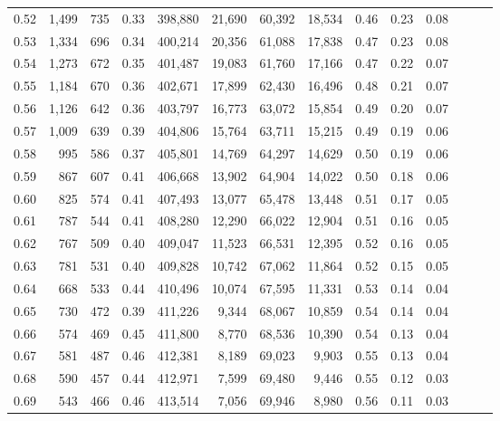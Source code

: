 \begin{tabular}{rrrrrrrrrrrrrr}
0.52 &   1,499 &    735 &  0.33 &  398,880 &   21,690 &  60,392 &  18,534 &  0.46 &  0.23 &      0.08 \\
0.53 &   1,334 &    696 &  0.34 &  400,214 &   20,356 &  61,088 &  17,838 &  0.47 &  0.23 &      0.08 \\
0.54 &   1,273 &    672 &  0.35 &  401,487 &   19,083 &  61,760 &  17,166 &  0.47 &  0.22 &      0.07 \\
0.55 &   1,184 &    670 &  0.36 &  402,671 &   17,899 &  62,430 &  16,496 &  0.48 &  0.21 &      0.07 \\
0.56 &   1,126 &    642 &  0.36 &  403,797 &   16,773 &  63,072 &  15,854 &  0.49 &  0.20 &      0.07 \\
0.57 &   1,009 &    639 &  0.39 &  404,806 &   15,764 &  63,711 &  15,215 &  0.49 &  0.19 &      0.06 \\
0.58 &     995 &    586 &  0.37 &  405,801 &   14,769 &  64,297 &  14,629 &  0.50 &  0.19 &      0.06 \\
0.59 &     867 &    607 &  0.41 &  406,668 &   13,902 &  64,904 &  14,022 &  0.50 &  0.18 &      0.06 \\
0.60 &     825 &    574 &  0.41 &  407,493 &   13,077 &  65,478 &  13,448 &  0.51 &  0.17 &      0.05 \\
0.61 &     787 &    544 &  0.41 &  408,280 &   12,290 &  66,022 &  12,904 &  0.51 &  0.16 &      0.05 \\
0.62 &     767 &    509 &  0.40 &  409,047 &   11,523 &  66,531 &  12,395 &  0.52 &  0.16 &      0.05 \\
0.63 &     781 &    531 &  0.40 &  409,828 &   10,742 &  67,062 &  11,864 &  0.52 &  0.15 &      0.05 \\
0.64 &     668 &    533 &  0.44 &  410,496 &   10,074 &  67,595 &  11,331 &  0.53 &  0.14 &      0.04 \\
0.65 &     730 &    472 &  0.39 &  411,226 &    9,344 &  68,067 &  10,859 &  0.54 &  0.14 &      0.04 \\
0.66 &     574 &    469 &  0.45 &  411,800 &    8,770 &  68,536 &  10,390 &  0.54 &  0.13 &      0.04 \\
0.67 &     581 &    487 &  0.46 &  412,381 &    8,189 &  69,023 &   9,903 &  0.55 &  0.13 &      0.04 \\
0.68 &     590 &    457 &  0.44 &  412,971 &    7,599 &  69,480 &   9,446 &  0.55 &  0.12 &      0.03 \\
0.69 &     543 &    466 &  0.46 &  413,514 &    7,056 &  69,946 &   8,980 &  0.56 &  0.11 &      0.03 \\

\end{tabular}
